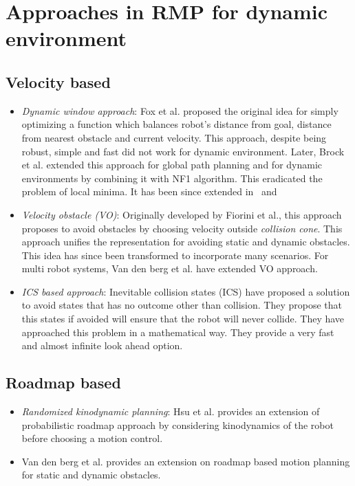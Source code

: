 \documentclass[rnd]{mas_proposal}
\begin{document}
\section{Approaches in RMP for dynamic environment}
\subsection{Velocity based}
\begin{itemize}
    \item \textit{Dynamic window approach}: Fox et al.\cite{fox1997dynamic} proposed the original idea for simply optimizing a function which balances robot's distance from goal, distance from nearest obstacle and current velocity. This approach, despite being robust, simple and fast did not work for dynamic environment. 
        Later, Brock et al.\cite{brock1999high} extended this approach for global path planning and for dynamic environments by combining it with NF1 algorithm. 
        This eradicated the problem of local minima. 
        It has been since extended in~\cite{seder2007dynamic} and~\cite{ogren2005convergent}
    \item \textit{Velocity obstacle (VO)}: Originally developed by Fiorini et al.\cite{fiorini1998motion}, this approach proposes to avoid obstacles by choosing velocity outside \textit{collision cone}.
        This approach unifies the representation for avoiding static and dynamic obstacles.
        This idea has since been transformed to incorporate many scenarios\cite{shiller2010nonlinear}\cite{owen2006a}\cite{owen2005motion}\cite{guy2009clearpath}. 
        For multi robot systems, Van den berg et al.\cite{van2008reciprocal}\cite{van2011reciprocal}\cite{van2006anytime} have extended VO approach.
    \item \textit{ICS based approach}: Inevitable collision states (ICS)\cite{fraichard2004inevitable}\cite{petti2005safe}\cite{martinez2009collision} have proposed a solution to avoid states that has no outcome other than collision. They propose that this states if avoided will ensure that the robot will never collide. They have approached this problem in a mathematical way. They provide a very fast and almost infinite look ahead option\cite{mohanan2018a}.

\end{itemize}

\subsection{Roadmap based}
\begin{itemize}
    \item \textit{Randomized kinodynamic planning}: Hsu et al.\cite{hsu2002randomized} provides an extension of probabilistic roadmap approach by considering kinodynamics of the robot before choosing a motion control.
    \item Van den berg et al.\cite{van2005roadmap} provides an extension on roadmap based motion planning for static and dynamic obstacles.
\end{itemize}
\end{document}
